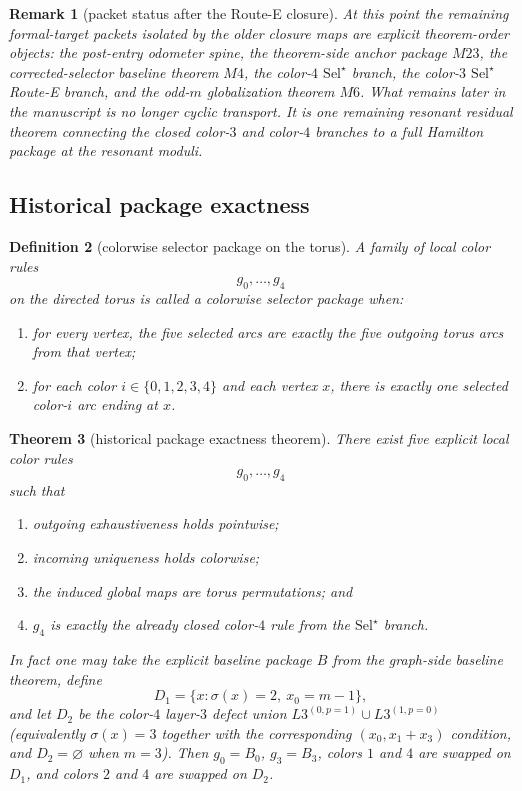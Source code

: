 \documentclass[11pt]{article}
\newtheorem{theorem}{Theorem}[section]
\newtheorem{remark}[theorem]{Remark}
\newtheorem{definition}[theorem]{Definition}
\newcommand{\SelStar}{\mathrm{Sel}^{\star}}
\begin{document}
\begin{remark}[packet status after the Route-E closure]
At this point the remaining formal-target packets isolated by the older
closure maps are explicit theorem-order objects:
the post-entry odometer spine, the theorem-side anchor package \(M23\), the
corrected-selector baseline theorem \(M4\), the color-$4$ \(\SelStar\) branch,
the color-$3$ \(\SelStar\) Route-E branch, and the odd-$m$ globalization
theorem \(M6\).
What remains later in the manuscript is no longer cyclic transport.
It is one remaining resonant residual theorem connecting the closed color-$3$ and
color-$4$ branches to a full Hamilton package at the resonant moduli.
\end{remark}

\subsection{Historical package exactness}

\begin{definition}[colorwise selector package on the torus]
A family of local color rules
\[
g_0,\dots,g_4
\]
on the directed torus is called a \emph{colorwise selector package} when:
\begin{enumerate}[label=\textup{(\arabic*)},leftmargin=2.8em]
\item for every vertex, the five selected arcs are exactly the five outgoing
      torus arcs from that vertex;
\item for each color $i\in\{0,1,2,3,4\}$ and each vertex $x$, there is exactly
      one selected color-$i$ arc ending at $x$.
\end{enumerate}
\end{definition}

\begin{theorem}[historical package exactness theorem]
\label{thm:G1-historical}
There exist five explicit local color rules
\[
g_0,\dots,g_4
\]
such that
\begin{enumerate}[label=\textup{(\arabic*)},leftmargin=2.8em]
\item outgoing exhaustiveness holds pointwise;
\item incoming uniqueness holds colorwise;
\item the induced global maps are torus permutations; and
\item \(g_4\) is exactly the already closed color-$4$ rule from the
      \(\SelStar\) branch.
\end{enumerate}
In fact one may take the explicit baseline package \(B\) from the graph-side
baseline theorem, define
\[
D_1=\{x:\sigma(x)=2,\ x_0=m-1\},
\]
and let \(D_2\) be the color-$4$ layer-$3$ defect union
\(L3^{(0,p=1)}\cup L3^{(1,p=0)}\) (equivalently
\(\sigma(x)=3\) together with the corresponding \((x_0,x_1+x_3)\) condition,
and \(D_2=\varnothing\) when \(m=3\)).
Then \(g_0=B_0\), \(g_3=B_3\), colors \(1\) and \(4\) are swapped on \(D_1\),
and colors \(2\) and \(4\) are swapped on \(D_2\).
\end{theorem}
\end{document}
